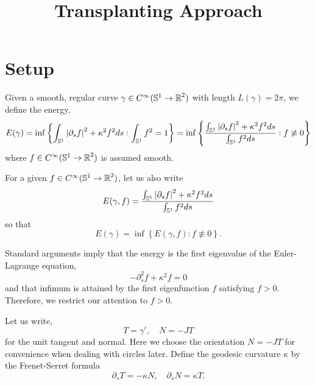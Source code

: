 \documentclass[12pt]{article}
\title{Transplanting Approach}
\date{}
\begin{document}
\maketitle

\section{Setup}

Given a smooth, regular curve \(\gamma \in C^{\infty}(\operatorname{\mathbb{S}^1} \to \operatorname{\mathbb{R}}^2)\) with length \(L(\gamma) = 2\pi\), we define the energy,
\begin{equation}
\label{eq:Egamma}
E(\gamma) = \inf\left\{\int_{\operatorname{\mathbb{S}^1}} \left|{\partial_s f}\right|^2 + \kappa^2 f^2 ds : \int_{\operatorname{\mathbb{S}^1}} f^2 = 1\right\} = \inf\left\{\frac{\int_{\operatorname{\mathbb{S}^1}} \left|{\partial_s f}\right|^2 + \kappa^2 f^2 ds}{\int_{\operatorname{\mathbb{S}^1}} f^2 ds} : f \not\equiv 0\right\}
\end{equation}
where \(f \in C^{\infty}(\operatorname{\mathbb{S}^1} \to \operatorname{\mathbb{R}}^2)\) is assumed smooth.

For a given \(f \in C^{\infty}(\operatorname{\mathbb{S}^1} \to \operatorname{\mathbb{R}}^2)\), let us also write
\begin{equation}
\label{eq:Egammaf}
E(\gamma, f) = \frac{\int_{\operatorname{\mathbb{S}^1}} \left|{\partial_s f}\right|^2 + \kappa^2 f^2 ds}{\int_{\operatorname{\mathbb{S}^1}} f^2 ds}
\end{equation}
so that
\begin{equation}
\label{eq:EgammaEgammaf}
E(\gamma) = \inf\left\{E(\gamma, f) : f \not\equiv 0\right\}.
\end{equation}

Standard arguments imply that the energy is the first eigenvalue of the Euler-Lagrange equation,
\begin{equation}
\label{eq:ELf}
-\partial_s^2 f + \kappa^2 f = 0
\end{equation}
and that infimum is attained by the first eigenfunction \(f\) satisfying \(f > 0\). Therefore, we restrict our attention to \(f > 0\).

Let us write,
\begin{equation}
\label{eq:TN}
T = \gamma', \quad N = -J T
\end{equation}
for the unit tangent and normal. Here we choose the orientation \(N = -JT\) for convenience when dealing with circles later. Define the geodesic curvature \(\kappa\) by the Frenet-Serret formula
\begin{equation}
\label{eq:FS}
\partial_s T = - \kappa N, \quad \partial_s N = \kappa T.
\end{equation}
\end{document}
